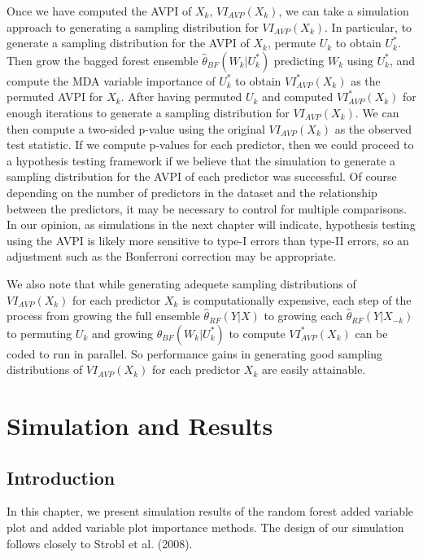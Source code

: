 \documentclass[12pt,twoside]{reedthesis}
\theoremstyle{definition}
\theoremstyle{definition}
\theoremstyle{definition}
\theoremstyle{remark}
\begin{document}
Once we have computed the AVPI of \(X_k\), \(VI_{AVP}(X_k)\), we can
take a simulation approach to generating a sampling distribution for
\(VI_{AVP}(X_k)\). In particular, to generate a sampling distribution
for the AVPI of \(X_k\), permute \(U_k\) to obtain \(U_k^*\). Then grow
the bagged forest ensemble \(\hat{\theta}_{BF}(W_k|U_k^*)\) predicting
\(W_k\) using \(U_k^*\), and compute the MDA variable importance of
\(U_k^*\) to obtain \(VI_{AVP}^*(X_k)\) as the permuted AVPI for
\(X_k\). After having permuted \(U_k\) and computed \(VI_{AVP}^*(X_k)\)
for enough iterations to generate a sampling distribution for
\(VI_{AVP}(X_k)\). We can then compute a two-sided p-value using the
original \(VI_{AVP}(X_k)\) as the observed test statistic. If we compute
p-values for each predictor, then we could proceed to a hypothesis
testing framework if we believe that the simulation to generate a
sampling distribution for the AVPI of each predictor was successful. Of
course depending on the number of predictors in the dataset and the
relationship between the predictors, it may be necessary to control for
multiple comparisons. In our opinion, as simulations in the next chapter
will indicate, hypothesis testing using the AVPI is likely more
sensitive to type-I errors than type-II errors, so an adjustment such as
the Bonferroni correction may be appropriate.

We also note that while generating adequete sampling distributions of
\(VI_{AVP}(X_k)\) for each predictor \(X_k\) is computationally
expensive, each step of the process from growing the full ensemble
\(\hat{\theta}_{RF}(Y|X)\) to growing each
\(\hat{\theta}_{RF}(Y|X_{-k})\) to permuting \(U_k\) and growing
\(\hat{\theta}_{BF}(W_k|U_k^*)\) to compute \(VI_{AVP}^*(X_k)\) can be
coded to run in parallel. So performance gains in generating good
sampling distributions of \(VI_{AVP}(X_k)\) for each predictor \(X_k\)
are easily attainable.

\chapter{Simulation and Results}\label{simulation-and-results}

\section{Introduction}\label{introduction-3}

In this chapter, we present simulation results of the random forest
added variable plot and added variable plot importance methods. The
design of our simulation follows closely to Strobl et al. (2008).
\end{document}
